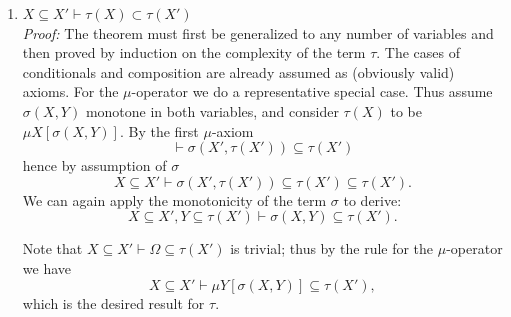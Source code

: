 \documentclass{article}
\begin{document}
\begin{enumerate}
    \item $X \subseteq X' \vdash \tau(X) \subset \tau(X')$ \\ 
        \textit{Proof:} The theorem must first be generalized to any number of variables and then proved by induction on the complexity of the term $\tau$. The cases of conditionals and composition are already assumed as (obviously valid) axioms. For the $\mu$-operator we do a representative special case. Thus assume $\sigma(X,Y)$ monotone in both variables, and consider $\tau(X)$ to be $\mu X[\sigma(X, Y)]$. By the first $\mu$-axiom 
        \begin{equation*}
            \vdash \sigma(X', \tau(X')) \subseteq \tau(X')
        \end{equation*}
hence by assumption of $\sigma$
        \begin{equation*}
            X \subseteq X' \vdash \sigma(X', \tau(X')) \subseteq \tau(X') \subseteq \tau(X').
        \end{equation*}
  We can again apply the monotonicity of the term $\sigma$ to derive:
        \begin{equation*}
            X \subseteq X', Y \subseteq \tau(X')  \vdash \sigma(X, Y) \subseteq \tau(X').
        \end{equation*}

        Note that $X \subseteq X' \vdash \Omega \subseteq \tau(X')$ is trivial; thus by the rule for the $\mu$-operator we have 
        \begin{equation*}
            X \subseteq X' \vdash \mu Y [\sigma(X,Y)] \subseteq \tau(X'),
        \end{equation*}
        which is the desired result for $\tau$. \\



\end{enumerate}
\end{document}
